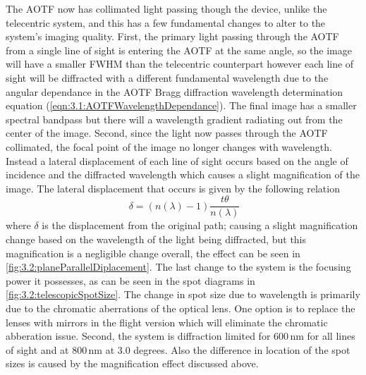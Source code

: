 The AOTF now has collimated light passing though the device, unlike the telecentric system, and this has a few fundamental changes to alter to the system's imaging quality. First, the primary light passing through the AOTF from a single line of sight is entering the AOTF at the same angle, so the image will have a smaller FWHM than the telecentric counterpart however each line of sight will be diffracted with a different fundamental wavelength due to the angular dependance in the AOTF Bragg diffraction wavelength determination equation (\autoref{eqn:3.1:AOTFWavelengthDependance}). The final image has a smaller spectral bandpass but there will a wavelength gradient radiating out from the center of the image. Second, since the light now passes through the AOTF collimated, the focal point of the image no longer changes with wavelength. Instead a lateral displacement of each line of sight occurs based on the angle of incidence and the diffracted wavelength which causes a slight magnification of the image. The lateral displacement that occurs is given by the following relation
\begin{equation}
    \ \delta = (n(\lambda)-1)\frac{t\theta}{n(\lambda)}
    \label{eqn:3.2:planeParallelDiplacement}
\end{equation}
where $\delta$ is the displacement from the original path; causing a slight magnification change based on the wavelength of the light being diffracted, but this magnification is a negligible change overall, the effect can be seen in \autoref{fig:3.2:planeParallelDiplacement}. The last change to the system is the focusing power it possesses, as can be seen in the spot diagrams in \autoref{fig:3.2:telescopicSpotSize}. The change in spot size due to wavelength is primarily due to the chromatic aberrations of the optical lens. One option is to replace the lenses with mirrors in the flight version which will eliminate the chromatic abberation issue. Second, the system is diffraction limited for 600\,nm for all lines of sight and at 800\,nm at 3.0 degrees. Also the difference in location of the spot sizes is caused by the magnification effect discussed above.


